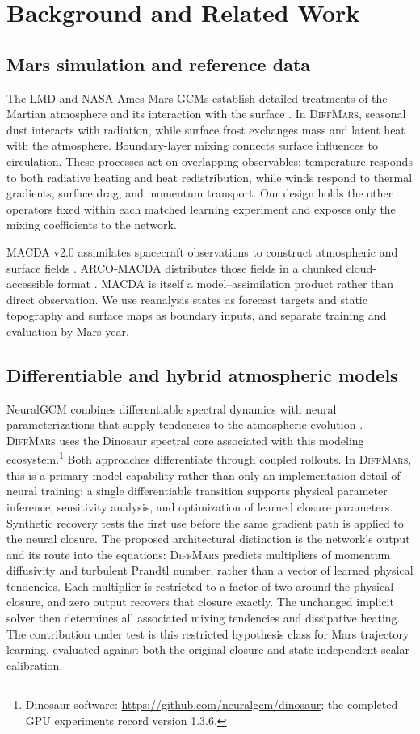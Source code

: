 \documentclass{article}
\newcommand{\model}{\textsc{DiffMars}}
\begin{document}
\section{Background and Related Work}
\subsection{Mars simulation and reference data}
The LMD and NASA Ames Mars GCMs establish detailed treatments of the Martian
atmosphere and its interaction with the surface
\citep{forget1999improved,haberle2019ames}. In \model, seasonal dust interacts
with radiation, while surface frost exchanges mass and latent heat with the
atmosphere. Boundary-layer mixing connects surface influences to circulation.
These processes act on overlapping observables: temperature responds to both
radiative heating and heat redistribution, while winds respond to thermal
gradients, surface drag, and momentum transport. Our design holds the other
operators fixed within each matched learning experiment and exposes only the
mixing coefficients to the network.

MACDA v2.0 assimilates spacecraft observations to construct atmospheric and
surface fields \citep{valeanu2026macda}. ARCO-MACDA distributes those fields
in a chunked cloud-accessible format \citep{bhattacharya2026arcomars}.
MACDA is itself a model--assimilation product rather than direct observation.
We use reanalysis states as forecast targets and static topography and surface
maps as boundary inputs, and separate training and evaluation by Mars year.

\subsection{Differentiable and hybrid atmospheric models}
NeuralGCM combines differentiable spectral dynamics with neural
parameterizations that supply tendencies to the atmospheric evolution
\citep{kochkov2024neuralgcm}. \model{} uses the Dinosaur
spectral core associated with this modeling ecosystem.\footnote{
Dinosaur software: \url{https://github.com/neuralgcm/dinosaur};
the completed GPU experiments record version 1.3.6.}
Both approaches differentiate through coupled rollouts. In \model{}, this is a
primary model capability rather than only an implementation detail of neural
training: a single differentiable transition supports physical parameter
inference, sensitivity analysis, and optimization of learned closure
parameters. Synthetic recovery tests the first use before the same gradient
path is applied to the neural closure. The proposed architectural distinction
is the network's output and its route into the equations: \model{} predicts
multipliers of momentum diffusivity and turbulent Prandtl number, rather than a
vector of learned physical tendencies.
Each multiplier is restricted to a factor of two around the physical closure,
and zero output recovers that closure exactly. The unchanged implicit solver
then determines all associated mixing tendencies and dissipative heating.
The contribution under test is this restricted hypothesis class for Mars
trajectory learning, evaluated against both the original closure and
state-independent scalar calibration.
\end{document}
